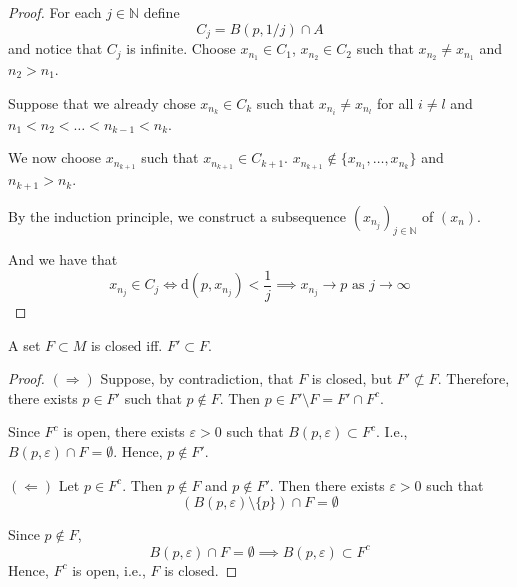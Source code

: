 \begin{proof}
    For each $j \in \mathbb{N}$ define 
    \[
        C_j = B(p, 1/j) \cap A
    \]
    and notice that $C_j$ is infinite. Choose $x_{n_1} \in C_1$, $x_{n_2} \in C_2$ such that $x_{n_2} \neq x_{n_1}$ and $n_2 > n_1$.

    Suppose that we already chose $x_{n_k} \in C_k$ such that $x_{n_i} \neq x_{n_l}$ for all $i \neq l$ and $n_1 < n_2 < \ldots < n_{k-1} < n_k$.

    We now choose $x_{n_{k+1}}$ such that $x_{n_{k+1}} \in C_{k+1}$. $x_{n_{k+1}} \notin \{ x_{n_1}, \ldots, x_{n_k} \}$ and $n_{k+1} > n_k$.

    By the induction principle, we construct a subsequence $(x_{n_j})_{j \in \mathbb{N}}$ of $(x_n)$.

    And we have that
    \[
        x_{n_j} \in C_j \iff \mathrm{d}(p, x_{n_j}) < \frac{1}{j} \implies x_{n_j} \longrightarrow p \text{ as } j \to \infty
    \]
\end{proof}

\begin{proposition}
    A set $F \subset M$ is closed iff. $F' \subset F$.
\end{proposition}

\begin{proof}
    $(\Rightarrow)$ Suppose, by contradiction, that $F$ is closed, but $F' \not\subset F$. Therefore, there exists $p \in F'$ such that $p \notin F$. Then $p \in F' \setminus F = F' \cap F^c$.
    
    Since $F^c$ is open, there exists $\varepsilon > 0$ such that $B(p, \varepsilon) \subset F^c$. I.e., $B(p, \varepsilon) \cap F = \emptyset$. Hence, $p \notin F'$.

    $(\Leftarrow)$ Let $p \in F^c$. Then $p \notin F$ and $p \notin F'$. Then there exists $\varepsilon > 0$ such that 
    \[
        (B(p, \varepsilon) \setminus \{ p \}) \cap F = \emptyset
    \]

    Since $p \notin F$, 
    \[
        B(p, \varepsilon) \cap F = \emptyset \implies B(p, \varepsilon) \subset F^c
    \]
    Hence, $F^c$ is open, i.e., $F$ is closed.
\end{proof}